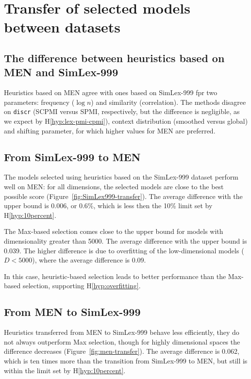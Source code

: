 \section{Transfer of selected models between datasets}
\label{sec:select-model-transf}

\subsection{The difference between heuristics based on MEN and SimLex-999}

Heuristics based on MEN agree with ones based on SimLex-999 fpr two parameters: frequency ($\log n$) and similarity (correlation). The methods disagree on \texttt{discr} (SCPMI versus SPMI, respectively, but the difference is negligible, as we expect by H\ref{hyp:lex-pmi-cpmi}), context distribution (smoothed versus global) and shifting parameter, for which higher values for MEN are preferred.

\subsection{From SimLex-999 to MEN}
\label{sec:simlex-men}



The models selected using heuristics based on the SimLex-999 dataset perform well on MEN: for all dimensions, the selected models are close to the best possible score (Figure~\ref{fig:SimLex999-transfer}). The average difference with the upper bound is 0.006, or 0.6\%, which is less then the 10\% limit set by H\ref{hyp:10percent}.
%
%
%

The Max-based selection comes close to the upper bound for models with dimensionality greater than 5000. The average difference with the upper bound is 0.039. The higher difference is due to overfitting of the low-dimensional models ($D < 5000$), where the average difference is 0.09.

In this case, heuristic-based selection leads to better performance than the Max-based selection, supporting H\ref{hyp:overfitting}.

\subsection{From MEN to SimLex-999}

Heuristics transferred from MEN to SimLex-999 behave less efficiently, they do not always outperform Max selection, though for highly dimensional spaces the difference decreases (Figure~\ref{fig:men-transfer}). The average difference is 0.062, which is ten times more than the transition from SimLex-999 to MEN, but still is within the limit set by H\ref{hyp:10percent}.

